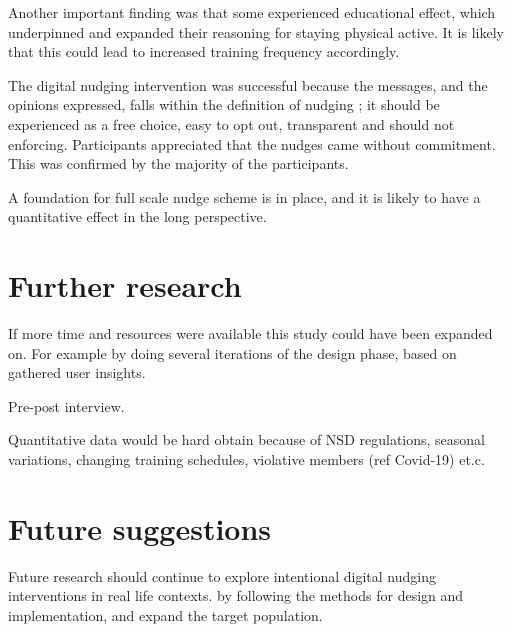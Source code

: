 Another important finding was that some experienced educational effect, which underpinned and expanded their reasoning for staying physical active. It is likely that this could lead to increased training frequency accordingly. 


The digital nudging intervention was successful because the messages, and the opinions expressed, falls within the definition of nudging ; it should be experienced as a free choice, easy to opt out, transparent and should not enforcing. Participants appreciated that the nudges came without commitment. This was confirmed by the majority of the participants. 

A foundation for full scale nudge scheme is in place, and it is likely to have a quantitative effect in the long perspective. 



\section{Further research}

If more time and resources were available this study could have been expanded on. 
For example by doing several iterations of the design phase, based on gathered user insights.  

Pre-post interview. 


Quantitative data would be hard obtain because of NSD regulations, seasonal variations, changing training schedules, violative members (ref Covid-19) et.c.

\section{Future suggestions}
Future research should continue to explore intentional digital nudging interventions in real life contexts.  by following the methods for design and implementation, and expand the target population. 

